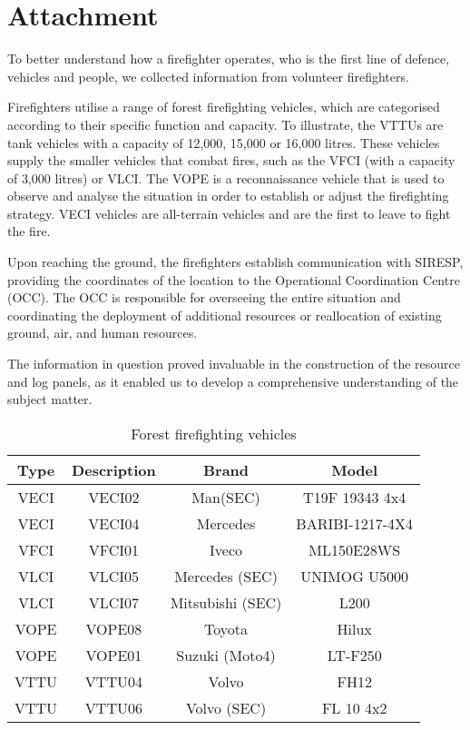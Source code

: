 \chapter{Attachment}
To better understand how a firefighter operates, who is the 
first line of defence, vehicles and people, we collected 
information from volunteer firefighters. \par
Firefighters utilise a range of forest firefighting vehicles, 
which are categorised according to their specific function and 
capacity. To illustrate, the VTTUs are tank vehicles with a 
capacity of 12,000, 15,000 or 16,000 litres. These vehicles 
supply the smaller vehicles that combat fires, such as the 
VFCI (with a capacity of 3,000 litres) or VLCI. The VOPE is a 
reconnaissance vehicle that is used to observe and analyse 
the situation in order to establish or adjust the firefighting
strategy. VECI vehicles are all-terrain vehicles and are the 
first to leave to fight the fire. \par
Upon reaching the ground, the firefighters establish 
communication with SIRESP, providing the coordinates of the 
location to the Operational Coordination Centre (OCC). The OCC
is responsible for overseeing the entire situation and 
coordinating the deployment of additional resources or 
reallocation of existing ground, air, and human resources. \par
The information in question proved invaluable in the construction 
of the resource and log panels, as it enabled us to develop a 
comprehensive understanding of the subject matter. \\ 
\begin{table}[H]
    \centering 
\caption{Forest firefighting vehicles} 
\begin{tabular}{ |c|c|c|c| } 
\hline
\textbf{Type} & \textbf{Description} & \textbf{Brand} & \textbf{Model} \\ 
\hline
VECI & VECI02 & Man(SEC) & T19F 19343 4x4 \\
\hline 
VECI & VECI04 & Mercedes & BARIBI-1217-4X4 \\ 
\hline
VFCI & VFCI01 & Iveco & ML150E28WS \\ 
\hline 
VLCI & VLCI05 & Mercedes (SEC) & UNIMOG U5000 \\ 
\hline 
VLCI & VLCI07 & Mitsubishi (SEC) & L200 \\ 
\hline 
VOPE & VOPE08 & Toyota & Hilux \\ 
\hline 
VOPE & VOPE01 & Suzuki (Moto4) & LT-F250 \\ 
\hline 
VTTU & VTTU04 & Volvo & FH12 \\
\hline 
VTTU & VTTU06 & Volvo (SEC) & FL 10 4x2 \\ 
\hline
\end{tabular}
\end{table}
